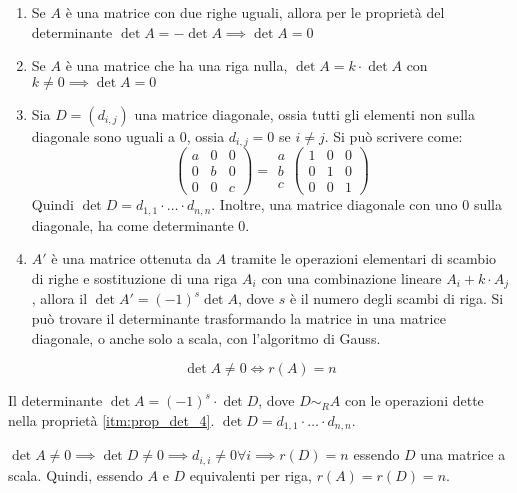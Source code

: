 \begin{enumerate}
    \item Se $A$ \`e una matrice con due righe uguali, allora per le propriet\`a del determinante $\det{A} = - \det{A} \implies \det{A} = 0$
    \item Se $A$ \`e una matrice che ha una riga nulla, $\det{A} = k \cdot \det{A} $ con $ k \neq 0 \implies \det{A} = 0$
    \item Sia $D = (d_{i,j})$ una matrice diagonale, ossia tutti gli elementi non sulla diagonale sono uguali a 0, ossia $d_{i,j} = 0$ se $i \neq j$. Si pu\`o scrivere come:
    \[
    \begin{pmatrix}
    a & 0 & 0 \\
    0 & b & 0 \\
    0 & 0 & c
    \end{pmatrix}
    = 
    \begin{matrix}
    a \\ b \\ c 
    \end{matrix}
    \begin{pmatrix}
    1 & 0 & 0 \\
    0 & 1 & 0 \\
    0 & 0 & 1
    \end{pmatrix}
    \]
    Quindi $\det D = d_{1,1} \cdot \ldots \cdot d_{n,n}$. Inoltre, una matrice diagonale con uno 0 sulla diagonale, ha come determinante 0.
    \item\label{itm:prop_det_4} $A'$ \`e una matrice ottenuta da $A$ tramite le operazioni elementari di scambio di righe e sostituzione di una riga $A_i$ con una combinazione lineare $A_i + k \cdot A_j$, allora il $\det{A'} = (-1)^s \det{A}$, dove $s$ \`e il numero degli scambi di riga. Si pu\`o trovare il determinante trasformando la matrice in una matrice diagonale, o anche solo a scala, con l'algoritmo di Gauss.
\end{enumerate}

\begin{prop}
\[
\det{A} \neq 0 \iff r(A) = n
\]
\end{prop}
Il determinante $\det{A} = (-1)^s \cdot \det{D}$, dove $D \sim_{R} A$ con le operazioni dette nella propriet\`a \ref{itm:prop_det_4}. $\det{D} = d_{1,1} \cdot \ldots \cdot d_{n,n}$.

$\det{A} \neq 0 \implies \det{D} \neq 0 \implies d_{i,i} \neq 0 \forall i \implies r(D) = n$ essendo $D$ una matrice a scala. Quindi, essendo $A$ e $D$ equivalenti per riga, $r(A) = r(D) = n$.


